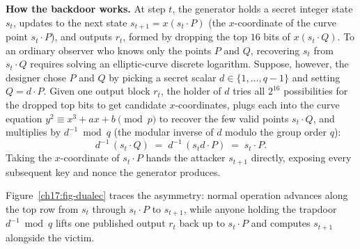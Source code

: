 \begin{attackbox}
\textbf{How the backdoor works.} At step $t$, the generator holds a secret integer state $s_t$, updates to the next state $s_{t+1} = x(s_t \cdot P)$ (the $x$-coordinate of the curve point $s_t \cdot P$), and outputs $r_t$, formed by dropping the top $16$ bits of $x(s_t \cdot Q)$. To an ordinary observer who knows only the points $P$ and $Q$, recovering $s_t$ from $s_t \cdot Q$ requires solving an elliptic-curve discrete logarithm. Suppose, however, the designer chose $P$ and $Q$ by picking a secret scalar $d \in \{1, \dots, q-1\}$ and setting $Q = d \cdot P$. Given one output block $r_t$, the holder of $d$ tries all $2^{16}$ possibilities for the dropped top bits to get candidate $x$-coordinates, plugs each into the curve equation $y^2 \equiv x^3 + ax + b \pmod p$ to recover the few valid points $s_t \cdot Q$, and multiplies by $d^{-1} \bmod q$ (the modular inverse of $d$ modulo the group order $q$):
\[
  d^{-1}\,(s_t \cdot Q) \;=\; d^{-1}\,(s_t d \cdot P) \;=\; s_t \cdot P.
\]
Taking the $x$-coordinate of $s_t \cdot P$ hands the attacker $s_{t+1}$ directly, exposing every subsequent key and nonce the generator produces.
\end{attackbox}

Figure~\ref{ch17:fig-dualec} traces the asymmetry: normal operation advances along the top row from $s_t$ through $s_t \cdot P$ to $s_{t+1}$, while anyone holding the trapdoor $d^{-1} \bmod q$ lifts one published output $r_t$ back up to $s_t \cdot P$ and computes $s_{t+1}$ alongside the victim.

